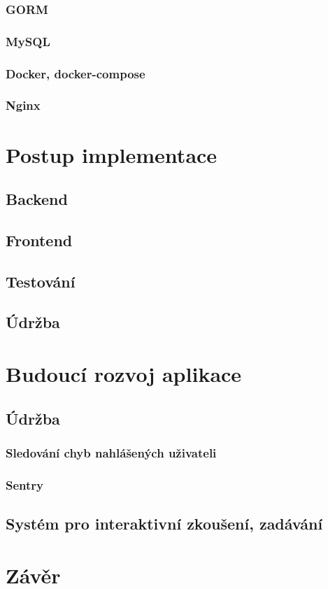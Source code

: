 \documentclass[14pt,a4paper]{article}
\begin{document}
            \subsubsection{GORM}
            \subsubsection{MySQL}
            \subsubsection{Docker, docker-compose}
            \subsubsection{Nginx}
	
	\section{Postup implementace}
        \subsection{Backend}
        \subsection{Frontend}
        \subsection{Testování}
        \subsection{Údržba}
        
	\section{Budoucí rozvoj aplikace}
        \subsection{Údržba}
            \subsubsection{Sledování chyb nahlášených uživateli}
            \subsubsection{Sentry}
        \subsection{Systém pro interaktivní zkoušení, zadávání}
	
	\section{Závěr}
	
	

\printbibliography
\end{document}
